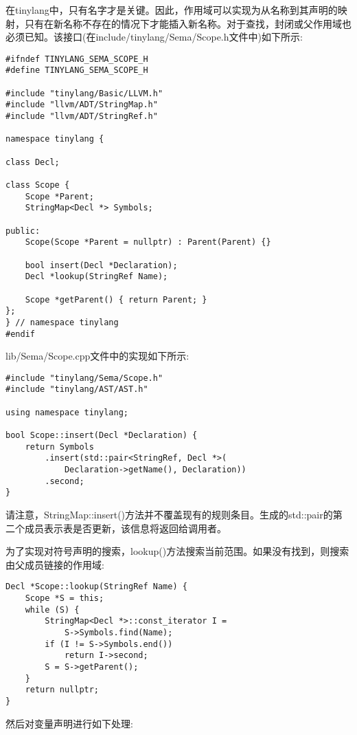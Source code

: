 在tinylang中，只有名字才是关键。因此，作用域可以实现为从名称到其声明的映射，只有在新名称不存在的情况下才能插入新名称。对于查找，封闭或父作用域也必须已知。该接口(在include/tinylang/Sema/Scope.h文件中)如下所示:\par

\begin{lstlisting}[caption={}]
#ifndef TINYLANG_SEMA_SCOPE_H
#define TINYLANG_SEMA_SCOPE_H

#include "tinylang/Basic/LLVM.h"
#include "llvm/ADT/StringMap.h"
#include "llvm/ADT/StringRef.h"

namespace tinylang {
	
class Decl;

class Scope {
	Scope *Parent;
	StringMap<Decl *> Symbols;
	
public:
	Scope(Scope *Parent = nullptr) : Parent(Parent) {}
	
	bool insert(Decl *Declaration);
	Decl *lookup(StringRef Name);
	
	Scope *getParent() { return Parent; }
};
} // namespace tinylang
#endif
\end{lstlisting}

lib/Sema/Scope.cpp文件中的实现如下所示:\par

\begin{lstlisting}[caption={}]
#include "tinylang/Sema/Scope.h"
#include "tinylang/AST/AST.h"

using namespace tinylang;

bool Scope::insert(Decl *Declaration) {
	return Symbols
		.insert(std::pair<StringRef, Decl *>(
			Declaration->getName(), Declaration))
		.second;
}
\end{lstlisting}

请注意，StringMap::insert()方法并不覆盖现有的规则条目。生成的std::pair的第二个成员表示表是否更新，该信息将返回给调用者。\par

为了实现对符号声明的搜索，lookup()方法搜索当前范围。如果没有找到，则搜索由父成员链接的作用域:\par

\begin{lstlisting}[caption={}]
Decl *Scope::lookup(StringRef Name) {
	Scope *S = this;
	while (S) {
		StringMap<Decl *>::const_iterator I =
			S->Symbols.find(Name);
		if (I != S->Symbols.end())
			return I->second;
		S = S->getParent();
	}
	return nullptr;
}
\end{lstlisting}

然后对变量声明进行如下处理:\par

